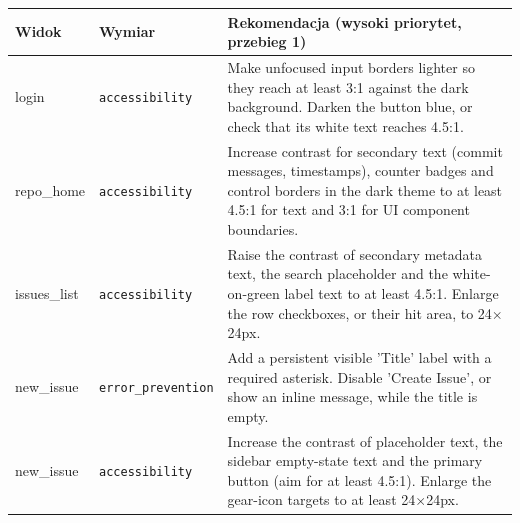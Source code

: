 {\renewcommand{\arraystretch}{1.2}
{\small
\par\smallskip\noindent\begin{tabular}{>{\raggedright\arraybackslash}p{}>{\raggedright\arraybackslash}p{}>{\raggedright\arraybackslash}p{}}
\toprule
\textbf{Widok} & \textbf{Wymiar} & \textbf{Rekomendacja (wysoki priorytet, przebieg 1)} \\
\midrule
login & \texttt{accessibility} & Make unfocused input borders lighter so they reach at least 3:1 against the dark background. Darken the button blue, or check that its white text reaches 4.5:1. \\
repo\_home & \texttt{accessibility} & Increase contrast for secondary text (commit messages, timestamps), counter badges and control borders in the dark theme to at least 4.5:1 for text and 3:1 for UI component boundaries. \\
issues\_list & \texttt{accessibility} & Raise the contrast of secondary metadata text, the search placeholder and the white-on-green label text to at least 4.5:1. Enlarge the row checkboxes, or their hit area, to 24$\times$24px. \\
new\_issue & \texttt{error\_\allowbreak{}prevention} & Add a persistent visible 'Title' label with a required asterisk. Disable 'Create Issue', or show an inline message, while the title is empty. \\
new\_issue & \texttt{accessibility} & Increase the contrast of placeholder text, the sidebar empty-state text and the primary button (aim for at least 4.5:1). Enlarge the gear-icon targets to at least 24$\times$24px. \\
\bottomrule
\end{tabular}\par\smallskip
}}
